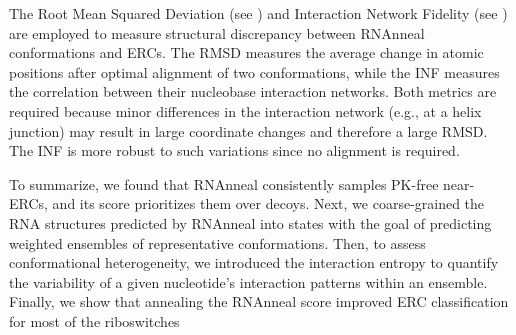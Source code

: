 The Root Mean Squared Deviation (see ) and Interaction Network Fidelity (see ) are employed to measure structural discrepancy between RNAnneal conformations and ERCs. The RMSD measures the average change in atomic positions after optimal alignment of two conformations, while the INF measures the correlation between their nucleobase interaction networks. Both metrics are required because minor differences in the interaction network (e.g., at a helix junction) may result in large coordinate changes and therefore a large RMSD. The INF is more robust to such variations since no alignment is required.

To summarize, we found that RNAnneal consistently samples PK-free near-ERCs, and its score prioritizes them over decoys. Next, we coarse-grained the RNA structures predicted by RNAnneal into states with the goal of predicting weighted ensembles of representative conformations. Then, to assess conformational heterogeneity, we introduced the interaction entropy to quantify the variability of a given nucleotide's interaction patterns within an ensemble. Finally, we show that annealing the RNAnneal score improved ERC classification for most of the riboswitches




